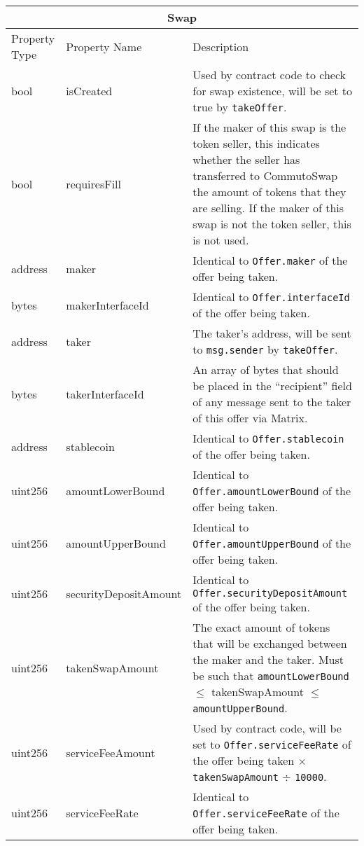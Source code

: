 \documentclass[11pt]{article}
\begin{document}
    \begin{longtable}[p]{ |p{2.5cm}|p{4cm}|p{7cm}| }
        \hline
        \multicolumn{3}{|c|}{Swap} \\
        \hline
        Property Type & Property Name & Description \\
        \hline
        bool & isCreated & Used by contract code to check for swap existence, will be set to true by \verb|takeOffer|. \\
        bool & requiresFill & If the maker of this swap is the token seller, this indicates whether the seller has transferred to CommutoSwap the amount of tokens that they are selling.
            If the maker of this swap is not the token seller, this is not used. \\
        address & maker & Identical to \verb|Offer.maker| of the offer being taken. \\
        bytes & makerInterfaceId & Identical to \verb|Offer.interfaceId| of the offer being taken. \\
        address & taker & The taker's address, will be sent to \verb|msg.sender| by \verb|takeOffer|. \\
        bytes & takerInterfaceId & An array of bytes that should be placed in the “recipient” field of
            any message sent to the taker of this offer via Matrix. \\
        address & stablecoin & Identical to \verb|Offer.stablecoin| of the offer being taken. \\
        uint256 & amountLowerBound & Identical to \verb|Offer.amountLowerBound| of the offer being taken. \\
        uint256 & amountUpperBound & Identical to \verb|Offer.amountUpperBound| of the offer being taken. \\
        uint256 & securityDepositAmount & Identical to \verb|Offer.securityDepositAmount| of the offer being taken. \\
        uint256 & takenSwapAmount & The exact amount of tokens that will be exchanged between the maker and the taker.
            Must be such that \verb|amountLowerBound| $\leq$ takenSwapAmount $\leq$ \verb|amountUpperBound|. \\
        uint256 & serviceFeeAmount & Used by contract code, will be set to \verb|Offer.serviceFeeRate| of the offer being taken $\times$ \verb|takenSwapAmount| $\div$ \verb|10000|.\\
        uint256 & serviceFeeRate & Identical to \verb|Offer.serviceFeeRate| of the offer being taken. \\

\end{longtable}
\end{document}
